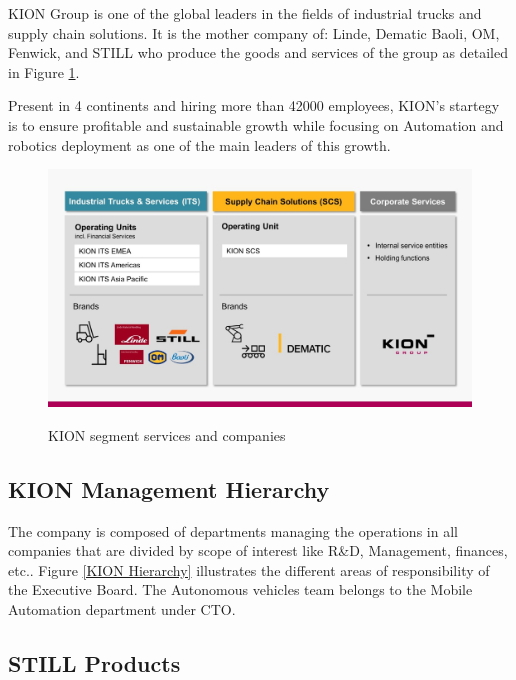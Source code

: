 KION Group is one of the global leaders in the fields of industrial trucks and supply chain solutions.
It is the mother company of: Linde, Dematic Baoli, OM, Fenwick, and STILL who produce the goods and services of the group as 
detailed in Figure \ref{KION Segments}. 

Present in 4 continents and hiring more than 42000 employees, KION's startegy is to ensure profitable and sustainable growth 
while focusing on Automation and robotics deployment as one of the main leaders of this growth. 

\begin{figure}[H]
    \begin{center}
    \includegraphics[width=5in]{images/Chap0/KION_Segments.jpg}\\
    \caption{KION segment services and companies \cite{R1}}
    \label{KION Segments}
    \end{center}
    \end{figure}

    
\subsection{KION Management Hierarchy}

The company is composed of departments managing the operations in all companies that are divided by scope of 
interest like R\&D, Management, finances, etc.. Figure \ref{KION Hierarchy} illustrates the different areas of 
responsibility of the Executive
Board. The Autonomous vehicles team belongs to the Mobile Automation department under CTO. 

\subsection{STILL Products}

